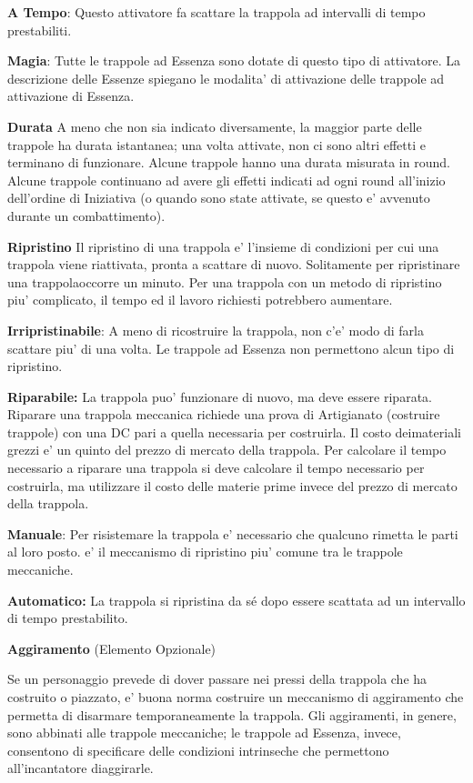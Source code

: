 \documentclass[a4paper,11pt,twoside,openany]{book}
\begin{document}
{		\textbf{A Tempo}: Questo attivatore fa scattare la trappola ad intervalli di tempo prestabiliti.
		
		\textbf{Magia}: Tutte le trappole ad Essenza sono dotate di questo tipo di attivatore. La descrizione delle Essenze spiegano le modalita' di attivazione delle trappole ad attivazione di Essenza. 
		
		\textbf{Durata}
		A meno che non sia indicato diversamente, la maggior parte delle trappole ha durata istantanea; una volta attivate, non ci sono altri effetti e terminano di funzionare. Alcune trappole hanno una durata misurata in round. Alcune trappole continuano ad avere gli effetti indicati ad ogni round all'inizio dell'ordine di Iniziativa (o quando sono state attivate, se questo e' avvenuto durante un combattimento).
		
		\textbf{Ripristino}
		Il ripristino di una trappola e' l'insieme di condizioni per cui una trappola viene riattivata, pronta a scattare di nuovo. Solitamente per ripristinare una trappolaoccorre un minuto. Per una trappola con un metodo di ripristino piu' complicato, il tempo ed il lavoro richiesti potrebbero aumentare.
		
		\textbf{Irripristinabile}: A meno di ricostruire la trappola, non c'e' modo di farla scattare piu' di una volta. Le trappole ad Essenza non permettono alcun tipo di ripristino.
		
		\textbf{Riparabile:} La trappola puo' funzionare di nuovo, ma deve essere riparata. Riparare una trappola meccanica richiede una prova di Artigianato (costruire trappole) con una DC pari a quella necessaria per costruirla. Il costo deimateriali grezzi e' un quinto del prezzo di mercato della trappola. Per calcolare il tempo necessario a riparare una trappola si deve calcolare il tempo necessario per costruirla, ma utilizzare il costo delle materie prime invece del prezzo di mercato della trappola.
		
		\textbf{Manuale}: Per risistemare la trappola e' necessario che qualcuno rimetta le parti al loro posto. e' il meccanismo di ripristino piu' comune tra le trappole meccaniche.
		
		\textbf{Automatico:} La trappola si ripristina da sé dopo essere scattata ad un intervallo di tempo prestabilito.
		
		\textbf{Aggiramento} (Elemento Opzionale)
		
		Se un personaggio prevede di dover passare nei pressi della trappola che ha costruito o piazzato, e' buona norma costruire un meccanismo di aggiramento che permetta di disarmare temporaneamente la trappola. Gli aggiramenti, in genere, sono abbinati alle trappole meccaniche; le trappole ad Essenza, invece, consentono di specificare delle condizioni intrinseche che permettono all'incantatore diaggirarle. 
		
}
\end{document}

